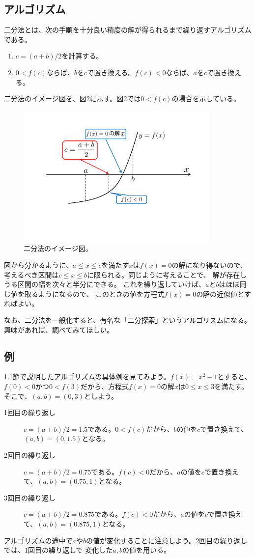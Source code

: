 \documentclass[a4paper, platex, dvipdfmx]{jsarticle}
\begin{document}
\subsection{アルゴリズム}
二分法とは、次の手順を十分良い精度の解が得られるまで繰り返すアルゴリズムである。
\begin{enumerate}
  \item $c=(a+b)/2$を計算する。
  \item $0<f(c)$ならば、$b$を$c$で置き換える。$f(c)<0$ならば、$a$を$c$で置き換える。
\end{enumerate}
二分法のイメージ図を、図2に示す。図2では$0<f(c)$の場合を示している。
\begin{figure}
  \centering
  \includegraphics[width=10cm]{fig/figure2.pdf}
  \caption{二分法のイメージ図。}
\end{figure}
図から分かるように、$a\leq x\leq c$を満たす$x$は$f(x)=0$の解になり得ないので、
考えるべき区間は$c\leq x\leq b$に限られる。同じように考えることで、
解が存在しうる区間の幅を次々と半分にできる。
これを繰り返していけば、$a$と$b$はほぼ同じ値を取るようになるので、
このときの値を方程式$f(x)=0$の解の近似値とすればよい。

なお、二分法を一般化すると、有名な「二分探索」というアルゴリズムになる。
興味があれば、調べてみてほしい。

\subsection{例}
1.1節で説明したアルゴリズムの具体例を見てみよう。$f(x)=x^2-1$とすると、
$f(0)<0$かつ$0<f(3)$だから、方程式$f(x)=0$の解$x$は$0\leq x\leq 3$を満たす。
そこで、$(a,b)=(0,3)$としよう。
\begin{description}
  \item[1回目の繰り返し]
    $c=(a+b)/2=1.5$である。$0<f(c)$だから、$b$の値を$c$で置き換えて、$(a,b)=(0,1.5)$となる。
  \item[2回目の繰り返し]
    $c=(a+b)/2=0.75$である。$f(c)<0$だから、$a$の値を$c$で置き換えて、$(a,b)=(0.75,1)$となる。
  \item[3回目の繰り返し]
    $c=(a+b)/2=0.875$である。$f(c)<0$だから、$a$の値を$c$で置き換えて、$(a,b)=(0.875,1)$となる。
\end{description}
アルゴリズムの途中で$a$や$b$の値が変化することに注意しよう。2回目の繰り返しでは、1回目の繰り返しで
変化した$a,b$の値を用いる。
\end{document}
